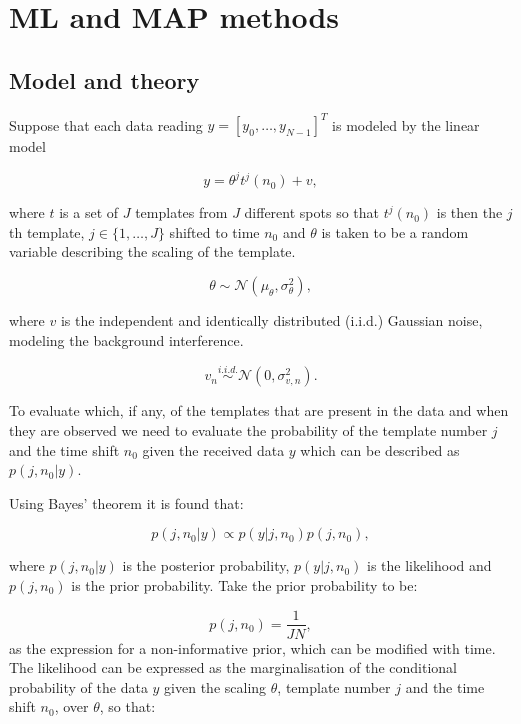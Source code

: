 \section{ML and MAP methods}
\subsection{Model and theory}
Suppose that each data reading $y = [y_0, \ldots , y_{N-1}]^T $ is modeled by the linear model

\begin{equation}\label{eq:MLmod1}
y = \theta^j t^j(n_0) + v,
\end{equation}

where $t$ is a set of $J$ templates from $J$ different spots so that $t^j(n_0)$ is then the $j$th template, $j \in \{1, \ldots ,J\}$ shifted to time $n_0$ and $\theta$ is taken to be a random variable describing the scaling of the template.

\begin{equation}\label{eq:MLtheta}
\theta \sim \mathcal{N}(\mu_{\theta},\sigma_{\theta}^2),
\end{equation}

where $v$ is the independent and identically distributed (i.i.d.) Gaussian noise, modeling the background interference.

\begin{equation}\label{eq:MLnoise}
v_n \stackrel{i.i.d.}{\sim} \mathcal{N}(0,\sigma_{v,n}^2).
\end{equation}

To evaluate which, if any, of the templates that are present in the data and when they are observed we need to evaluate the probability of the template number $j$ and the time shift $n_0$ given the received data $y$ which can be described as $p(j,n_0|y)$.

Using Bayes' theorem it is found that:

\begin{equation}\label{eq:MLBayes}
p(j,n_0|y) \propto p(y|j,n_0)p(j,n_0),
\end{equation}

where $p(j,n_0|y)$ is the posterior probability, $p(y|j,n_0)$ is the likelihood and $p(j,n_0)$ is the prior probability.
Take the prior probability to be:

\begin{equation}\label{eq:MLPrior}
p(j,n_0) = \frac{1}{JN},
\end{equation}
as the expression for a non-informative prior, which can be modified with time.
The likelihood can be expressed as the marginalisation of the conditional probability of the data $y$ given the scaling $\theta$, template number $j$ and the time shift $n_0$, over $\theta$, so that:

